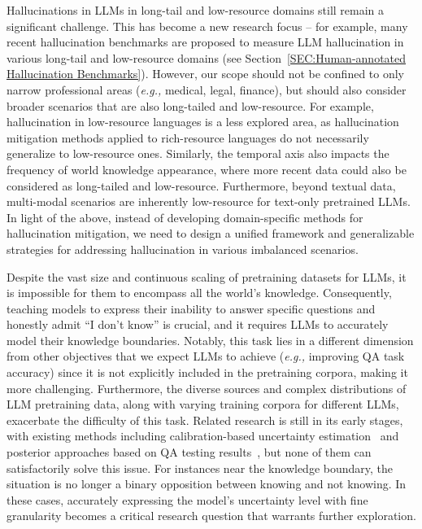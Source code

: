 Hallucinations in LLMs in long-tail and low-resource domains still remain a significant challenge. This has become a new research focus -- for example, many recent hallucination benchmarks are proposed to measure LLM hallucination in various long-tail and low-resource domains (see Section~\ref{SEC:Human-annotated Hallucination Benchmarks}). However, our scope should not be confined to only narrow professional areas (\textit{e.g.,} medical, legal, finance), but should also consider broader scenarios that are also long-tailed and low-resource. For example, hallucination in low-resource languages is a less explored area, as hallucination mitigation methods applied to rich-resource languages do not necessarily generalize to low-resource ones. Similarly, the temporal axis also impacts the frequency of world knowledge appearance, where more recent data could also be considered as long-tailed and low-resource. Furthermore, beyond textual data, multi-modal scenarios are inherently low-resource for text-only pretrained LLMs. In light of the above, instead of developing domain-specific methods for hallucination mitigation, we need to design a unified framework and generalizable strategies for addressing hallucination in various imbalanced scenarios.

Despite the vast size and continuous scaling of pretraining datasets for LLMs, it is impossible for them to encompass all the world's knowledge. Consequently, teaching models to express their inability to answer specific questions and honestly admit ``I don't know'' is crucial, and it requires LLMs to accurately model their knowledge boundaries. Notably, this task lies in a different dimension from other objectives that we expect LLMs to achieve (\textit{e.g.,} improving QA task accuracy) since it is not explicitly included in the pretraining corpora, making it more challenging. Furthermore, the diverse sources and complex distributions of LLM pretraining data, along with varying training corpora for different LLMs, exacerbate the difficulty of this task. Related research is still in its early stages, with existing methods including calibration-based uncertainty estimation~ and posterior approaches based on QA testing results~, but none of them can satisfactorily solve this issue. For instances near the knowledge boundary, the situation is no longer a binary opposition between knowing and not knowing. In these cases, accurately expressing the model's uncertainty level with fine granularity becomes a critical research question that warrants further exploration.

